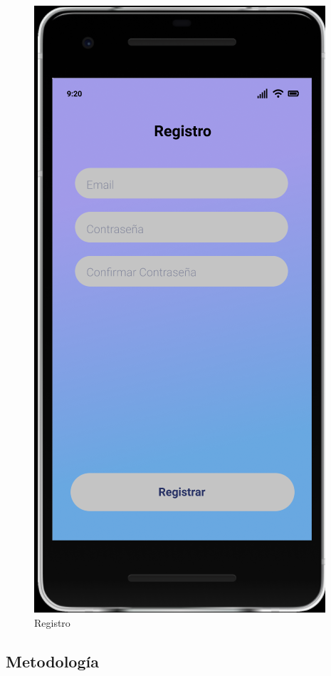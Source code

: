 \documentclass{article}
\begin{document}
\begin{figure}[H]
    \centering
    \includegraphics[scale=0.9]{imgs/Figma/Registro2}
    \caption{Registro}
\end{figure}
\subsection{Metodología}
\pagebreak
\end{document}
